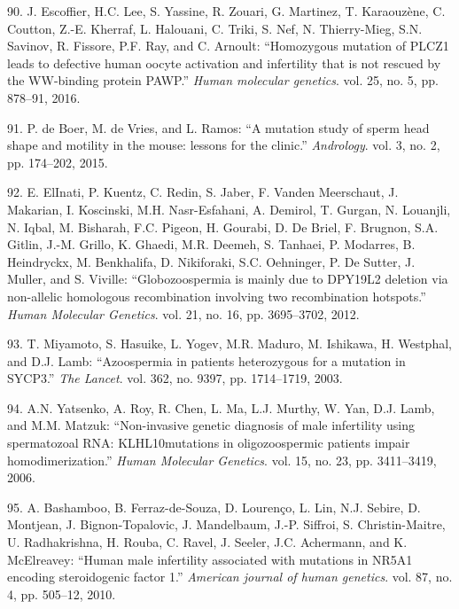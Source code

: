 \documentclass[12pt,a4paper,twoside]{ugathesis}
\theoremstyle{definition}
\theoremstyle{definition}
\theoremstyle{definition}
\theoremstyle{remark}
\begin{document}
\hypertarget{ref-Escoffier2016}{}
90. J. Escoffier, H.C. Lee, S. Yassine, R. Zouari, G. Martinez, T.
Karaouzène, C. Coutton, Z.-E. Kherraf, L. Halouani, C. Triki, S. Nef, N.
Thierry-Mieg, S.N. Savinov, R. Fissore, P.F. Ray, and C. Arnoult:
``Homozygous mutation of PLCZ1 leads to defective human oocyte
activation and infertility that is not rescued by the WW-binding protein
PAWP.'' \emph{Human molecular genetics}. vol. 25, no. 5, pp. 878--91,
2016.

\hypertarget{ref-DeBoer2015}{}
91. P. de Boer, M. de Vries, and L. Ramos: ``A mutation study of sperm
head shape and motility in the mouse: lessons for the clinic.''
\emph{Andrology}. vol. 3, no. 2, pp. 174--202, 2015.

\hypertarget{ref-ElInati2012}{}
92. E. ElInati, P. Kuentz, C. Redin, S. Jaber, F. Vanden Meerschaut, J.
Makarian, I. Koscinski, M.H. Nasr-Esfahani, A. Demirol, T. Gurgan, N.
Louanjli, N. Iqbal, M. Bisharah, F.C. Pigeon, H. Gourabi, D. De Briel,
F. Brugnon, S.A. Gitlin, J.-M. Grillo, K. Ghaedi, M.R. Deemeh, S.
Tanhaei, P. Modarres, B. Heindryckx, M. Benkhalifa, D. Nikiforaki, S.C.
Oehninger, P. De Sutter, J. Muller, and S. Viville: ``Globozoospermia is
mainly due to DPY19L2 deletion via non-allelic homologous recombination
involving two recombination hotspots.'' \emph{Human Molecular Genetics}.
vol. 21, no. 16, pp. 3695--3702, 2012.

\hypertarget{ref-Miyamoto2003}{}
93. T. Miyamoto, S. Hasuike, L. Yogev, M.R. Maduro, M. Ishikawa, H.
Westphal, and D.J. Lamb: ``Azoospermia in patients heterozygous for a
mutation in SYCP3.'' \emph{The Lancet}. vol. 362, no. 9397, pp.
1714--1719, 2003.

\hypertarget{ref-Yatsenko2006}{}
94. A.N. Yatsenko, A. Roy, R. Chen, L. Ma, L.J. Murthy, W. Yan, D.J.
Lamb, and M.M. Matzuk: ``Non-invasive genetic diagnosis of male
infertility using spermatozoal RNA: KLHL10mutations in oligozoospermic
patients impair homodimerization.'' \emph{Human Molecular Genetics}.
vol. 15, no. 23, pp. 3411--3419, 2006.

\hypertarget{ref-Bashamboo2010}{}
95. A. Bashamboo, B. Ferraz-de-Souza, D. Lourenço, L. Lin, N.J. Sebire,
D. Montjean, J. Bignon-Topalovic, J. Mandelbaum, J.-P. Siffroi, S.
Christin-Maitre, U. Radhakrishna, H. Rouba, C. Ravel, J. Seeler, J.C.
Achermann, and K. McElreavey: ``Human male infertility associated with
mutations in NR5A1 encoding steroidogenic factor 1.'' \emph{American
journal of human genetics}. vol. 87, no. 4, pp. 505--12, 2010.
\end{document}
